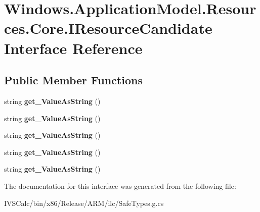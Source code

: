 \hypertarget{interface_windows_1_1_application_model_1_1_resources_1_1_core_1_1_i_resource_candidate}{}\section{Windows.\+Application\+Model.\+Resources.\+Core.\+I\+Resource\+Candidate Interface Reference}
\label{interface_windows_1_1_application_model_1_1_resources_1_1_core_1_1_i_resource_candidate}
\subsection*{Public Member Functions}
\begin{DoxyCompactItemize}
\item 
\mbox{\label{interface_windows_1_1_application_model_1_1_resources_1_1_core_1_1_i_resource_candidate_a004e5b59fc3a0bf08d9e55e70090a689}} 
string {\bfseries get\+\_\+\+Value\+As\+String} ()
\item 
\mbox{\label{interface_windows_1_1_application_model_1_1_resources_1_1_core_1_1_i_resource_candidate_a004e5b59fc3a0bf08d9e55e70090a689}} 
string {\bfseries get\+\_\+\+Value\+As\+String} ()
\item 
\mbox{\label{interface_windows_1_1_application_model_1_1_resources_1_1_core_1_1_i_resource_candidate_a004e5b59fc3a0bf08d9e55e70090a689}} 
string {\bfseries get\+\_\+\+Value\+As\+String} ()
\item 
\mbox{\label{interface_windows_1_1_application_model_1_1_resources_1_1_core_1_1_i_resource_candidate_a004e5b59fc3a0bf08d9e55e70090a689}} 
string {\bfseries get\+\_\+\+Value\+As\+String} ()
\item 
\mbox{\label{interface_windows_1_1_application_model_1_1_resources_1_1_core_1_1_i_resource_candidate_a004e5b59fc3a0bf08d9e55e70090a689}} 
string {\bfseries get\+\_\+\+Value\+As\+String} ()
\end{DoxyCompactItemize}


The documentation for this interface was generated from the following file\+:\begin{DoxyCompactItemize}
\item 
I\+V\+S\+Calc/bin/x86/\+Release/\+A\+R\+M/ilc/Safe\+Types.\+g.\+cs\end{DoxyCompactItemize}

